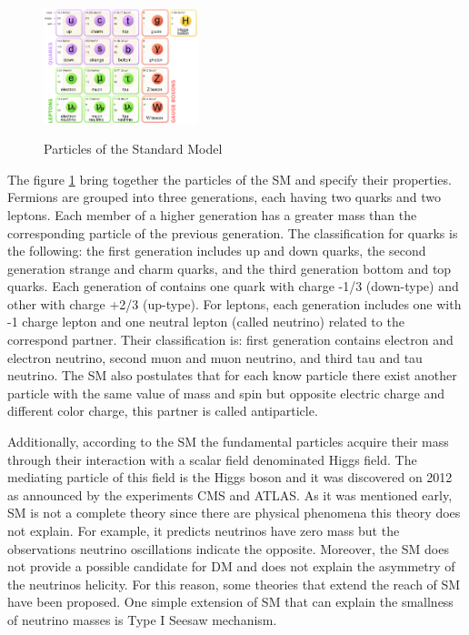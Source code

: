  \begin{figure}[h] 
 \centering
 \caption{Particles of the Standard Model}
 \includegraphics[width=0.4\textwidth]{./Capitulos/StateArt/standard_model} 
 \label{Estandar model}
 \end{figure} 

The figure \ref{Estandar model} bring together the particles of the SM and specify their properties. Fermions are grouped into three generations, each having two quarks and two leptons. Each member of a higher generation has a greater mass than the corresponding particle of the previous generation. The classification for quarks is the following: the first generation includes up and down quarks, the second generation strange and charm quarks, and the third generation bottom and top quarks. Each generation of contains one quark with charge -1/3 (down-type) and other with charge +2/3 (up-type). For leptons, each generation includes one with -1 charge lepton and one neutral lepton (called neutrino) related to the correspond partner. Their classification is: first generation contains electron and electron neutrino, second muon and muon neutrino, and third tau and tau neutrino. The SM also postulates that for each know particle there exist another particle with the same value of mass and spin but opposite electric charge and different color charge, this partner is called antiparticle.

Additionally, according to the SM the fundamental particles acquire their mass through their interaction with a scalar field denominated Higgs field. The mediating particle of this field is the Higgs boson and it was discovered on 2012 as announced by the experiments CMS and ATLAS. As it was mentioned early, SM is not a complete theory since there are physical phenomena this theory does not explain. For example, it predicts neutrinos have zero mass but the observations neutrino oscillations indicate the opposite. Moreover, the SM does not provide a possible candidate for DM and does not explain the asymmetry of the neutrinos helicity. For this reason, some theories that extend the reach of SM have been proposed. One simple extension of SM that can explain the smallness of neutrino masses is Type I Seesaw mechanism. 

